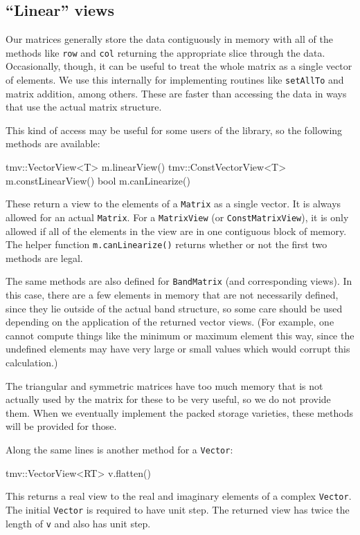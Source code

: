 \documentclass[twoside,letterpaper,11pt]{article}
\renewcommand{\tt}[1]{{\lstinline {#1}}}
\begin{document}
\subsection{``Linear'' views}
\label{LinearViews}

Our matrices generally store the data contiguously in memory with all of the 
methods like \tt{row} and \tt{col} returning the appropriate slice through the
data.  Occasionally, though, it can be useful to treat the whole matrix
as a single vector of elements.  We use this internally for implementing routines
like \tt{setAllTo} and matrix addition, among others.  These are faster than
accessing the data in ways that use the actual matrix structure.

This kind of access may be useful for some users of the library, 
so the following methods are available:
\begin{tmvcode}
tmv::VectorView<T> m.linearView()
tmv::ConstVectorView<T> m.constLinearView()
bool m.canLinearize()
\end{tmvcode}
These return a view to the elements of a \tt{Matrix} as a single vector.  
It is always allowed for an actual \tt{Matrix}.  For a \tt{MatrixView} 
(or \tt{ConstMatrixView}), it is only allowed if all of the elements in the 
view are in one contiguous block of memory.  The helper function 
\tt{m.canLinearize()} returns whether or not the first two methods are legal.

The same methods are also defined for \tt{BandMatrix} (and corresponding views).
In this case, there are a few elements in memory that are not necessarily
defined, since they lie outside of the actual band structure, so some care
should be used depending on the application of the returned vector views.  
(For example, one cannot compute things like the
minimum or maximum element this way, since the undefined elements may
have very large or small values which would corrupt this calculation.)

The triangular and symmetric matrices have too much memory that is not
actually used by the matrix for these to be very useful, so we do not provide them.
When we eventually implement the packed storage varieties, these methods will
be provided for those.

Along the same lines is another method for a \tt{Vector}:
\begin{tmvcode}
tmv::VectorView<RT> v.flatten()
\end{tmvcode}
This returns a real view to the real and imaginary elements of a complex \tt{Vector}. 
The initial \tt{Vector} is required to have unit step.  The returned view has twice the 
length of \tt{v} and also has unit step.
\end{document}
